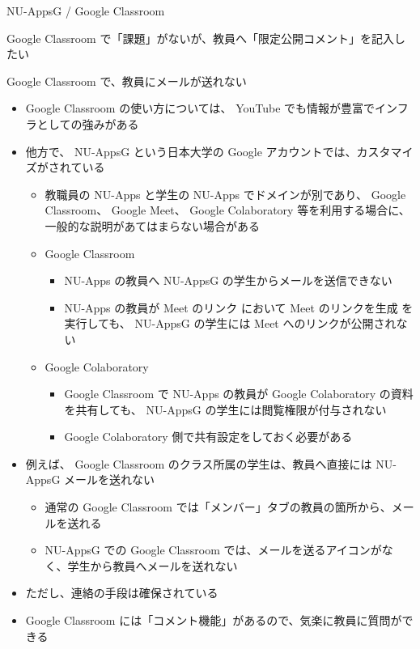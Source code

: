 \documentclass[a4j,10pt]{jsarticle}
\begin{document}
{\begin{frame}[label={sec:orgbe869cf},fragile]{NU-AppsG / Google Classroom}
\begin{block}{Google Classroom で「課題」がないが、教員へ「限定公開コメント」を記入したい}
\begin{itemize}
\begin{itemize}
\end{itemize}
\end{itemize}
\end{block}
\par
\begin{block}{Google Classroom で、教員にメールが送れない}
\begin{itemize}
\item Google Classroom の使い方については、 YouTube でも情報が豊富でインフラとしての強みがある
\item 他方で、 NU-AppsG という日本大学の Google アカウントでは、カスタマイズがされている
\begin{itemize}
\item 教職員の NU-Apps と学生の NU-Apps でドメインが別であり、 Google Classroom、 Google Meet、 Google Colaboratory 等を利用する場合に、一般的な説明があてはまらない場合がある
\item Google Classroom
\begin{itemize}
\item NU-Apps の教員へ  NU-AppsG の学生からメールを送信できない
\item NU-Apps の教員が \alert{Meet のリンク} において \alert{Meet のリンクを生成} を実行しても、 NU-AppsG の学生には Meet へのリンクが公開されない
\end{itemize}
\item Google Colaboratory
\begin{itemize}
\item Google Classroom で NU-Apps の教員が Google Colaboratory の資料を共有しても、 NU-AppsG の学生には閲覧権限が付与されない
\item Google Colaboratory 側で共有設定をしておく必要がある
\end{itemize}
\end{itemize}
\item 例えば、 Google Classroom のクラス所属の学生は、教員へ直接には NU-AppsG メールを送れない
\begin{itemize}
\item 通常の Google Classroom では「メンバー」タブの教員の箇所から、メールを送れる
\item NU-AppsG での Google Classroom では、メールを送るアイコンがなく、学生から教員へメールを送れない
\end{itemize}
\par
\item ただし、連絡の手段は確保されている
\item Google Classroom には「コメント機能」があるので、気楽に教員に質問ができる

\end{itemize}
\end{block}
\end{frame}}
\end{document}
